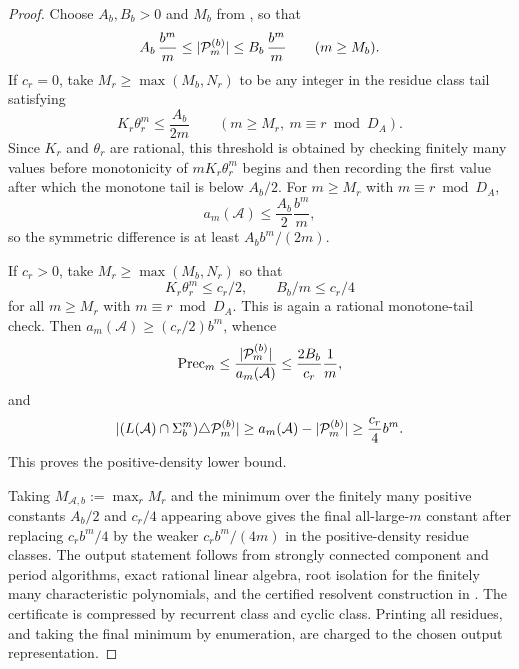 \begin{proof}
  Choose \(A_b,B_b>0\) and \(M_b\) from
  , so that
  \[
    A_b\,\frac{b^m}{m}
    \le\lvert \mathcal P_m^{(b)} \rvert
    \le B_b\,\frac{b^m}{m}
    \qquad(m\ge M_b).
  \]
  If \(c_r=0\), take \(M_r\ge \max(M_b,N_r)\) to be any integer in the
  residue class tail satisfying
  \[
    K_r\theta_r^m\le \frac{A_b}{2m}
    \qquad(m\ge M_r,\ m\equiv r\bmod {D_A}).
  \]
  Since \(K_r\) and \(\theta_r\) are rational, this threshold is
  obtained by checking finitely many values before monotonicity of
  \(mK_r\theta_r^m\) begins and then recording the first value after
  which the monotone tail is below \(A_b/2\).
  For \(m\ge M_r\) with \(m\equiv r\bmod {D_A}\),
  \[
    a_m(\mathcal A)\le \frac{A_b}{2}\frac{b^m}{m},
  \]
  so the symmetric difference is at least
  \(A_b b^m/(2m)\).

  If \(c_r>0\), take \(M_r\ge \max(M_b,N_r)\) so that
  \[
    K_r\theta_r^m\le c_r/2,
    \qquad
    B_b/m\le c_r/4
  \]
  for all \(m\ge M_r\) with \(m\equiv r\bmod {D_A}\). This is again a
  rational monotone-tail check.
  Then \(a_m(\mathcal A)\ge(c_r/2)b^m\), whence
  \[
    \mathrm{Prec}_m
    \le\frac{\lvert \mathcal P_m^{(b)} \rvert}{a_m(\mathcal A)}
    \le\frac{2B_b}{c_r}\frac1m,
  \]
  and
  \[
    \lvert (L(\mathcal A)\cap\Sigma_b^m)\triangle\mathcal P_m^{(b)} \rvert
    \ge a_m(\mathcal A)-\lvert \mathcal P_m^{(b)} \rvert
    \ge \frac{c_r}{4}b^m.
  \]
  This proves the positive-density lower bound.

  Taking
  \(M_{\mathcal A,b}:=\max_r M_r\) and the minimum over the finitely many
  positive constants \(A_b/2\) and \(c_r/4\) appearing above gives the
  final all-large-\(m\) constant after replacing \(c_r b^m/4\) by the
  weaker \(c_r b^m/(4m)\) in the positive-density residue classes.
  The output statement follows from strongly connected component and
  period algorithms, exact rational linear algebra, root isolation for
  the finitely many characteristic polynomials, and the certified
  resolvent construction in .
  The certificate is compressed by recurrent class and cyclic class.
  Printing all residues, and taking the final minimum by enumeration,
  are charged to the chosen output representation.
\end{proof}

